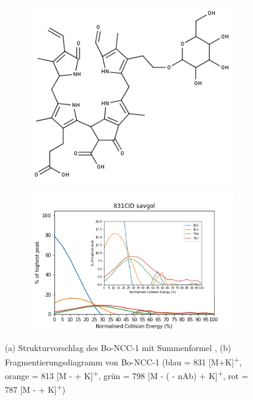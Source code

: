 \begin{figure}[!htbp]
  \begin{subfigure}[b]{0.5\textwidth}
    \includegraphics[width=\textwidth]{figures/Kapitel4/Kataboliten/fragmentation_structures/VWA_Katabolit_831.png}
    \caption{}
    \label{fig:831MKLeafspraystructure}
  \end{subfigure}
  \hfill
  \begin{subfigure}[b]{0.7\textwidth}
    \includegraphics[width=\textwidth]{figures/Kapitel4/Kataboliten/diags/831CID-savgol.png}
    \caption{}
    \label{fig:831MKLeafspraydiags}
  \end{subfigure}
  \caption[Strukturvorschlag von Bo-NCC-1 und Fragmentierungsdiagramm, Quelle: Autor]{(a) Strukturvorschlag des Bo-NCC-1 mit Summenformel , (b) Fragmentierungsdiagramm von Bo-NCC-1 (blau = 831 [M+K]\textsuperscript{+}, orange = 813 [M -  + K]\textsuperscript{+}, grün = 798 [M - ( - \gls{nAb}) + K]\textsuperscript{+}, rot = 787 [M -  + K]\textsuperscript{+})}
\end{figure}



